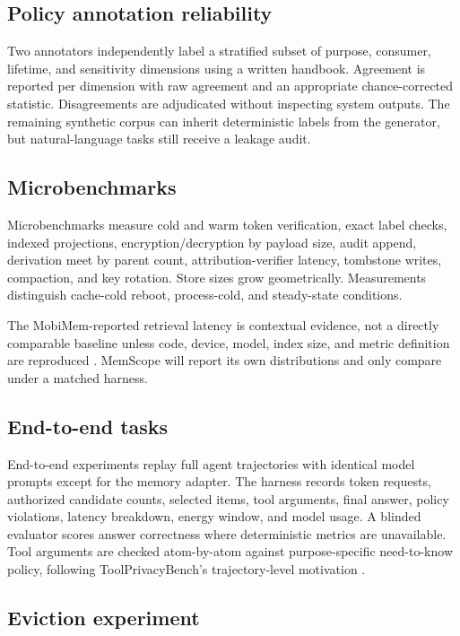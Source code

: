 \subsection{Policy annotation reliability}

Two annotators independently label a stratified subset of purpose, consumer, lifetime, and sensitivity dimensions using a written handbook. Agreement is reported per dimension with raw agreement and an appropriate chance-corrected statistic. Disagreements are adjudicated without inspecting system outputs. The remaining synthetic corpus can inherit deterministic labels from the generator, but natural-language tasks still receive a leakage audit.

\subsection{Microbenchmarks}

Microbenchmarks measure cold and warm token verification, exact label checks, indexed projections, encryption/decryption by payload size, audit append, derivation meet by parent count, attribution-verifier latency, tombstone writes, compaction, and key rotation. Store sizes grow geometrically. Measurements distinguish cache-cold reboot, process-cold, and steady-state conditions.

The MobiMem-reported retrieval latency is contextual evidence, not a directly comparable baseline unless code, device, model, index size, and metric definition are reproduced \citep{liu2025mobimem}. MemScope will report its own distributions and only compare under a matched harness.

\subsection{End-to-end tasks}

End-to-end experiments replay full agent trajectories with identical model prompts except for the memory adapter. The harness records token requests, authorized candidate counts, selected items, tool arguments, final answer, policy violations, latency breakdown, energy window, and model usage. A blinded evaluator scores answer correctness where deterministic metrics are unavailable. Tool arguments are checked atom-by-atom against purpose-specific need-to-know policy, following ToolPrivacyBench's trajectory-level motivation \citep{hu2026toolprivacy}.

\subsection{Eviction experiment}

